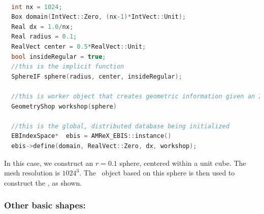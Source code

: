 \begin{lstlisting}[language=cpp]

  int nx = 1024;
  Box domain(IntVect::Zero, (nx-1)*IntVect::Unit);
  Real dx = 1.0/nx;
  Real radius = 0.1;
  RealVect center = 0.5*RealVect::Unit;
  bool insideRegular = true;
  //this is the implicit function
  SphereIF sphere(radius, center, insideRegular);

  //this is worker object that creates geometric information given an IF
  GeometryShop workshop(sphere)

  //this is the global, distributed database being initialized
  EBIndexSpace*  ebis = AMReX_EBIS::instance()
  ebis->define(domain, RealVect::Zero, dx, workshop);

\end{lstlisting}

In this case, we construct an $r=0.1$ sphere, centered within a unit cube.  The mesh resolution is $1024^3$.
The \geom\ object based on this sphere is then used to construct the \ebis, as shown.

\subsubsection{Other basic shapes:}

